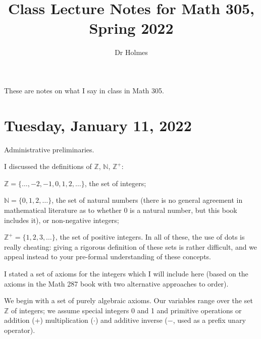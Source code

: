 \documentclass[12pt]{article}
\title{Class Lecture Notes for Math 305, Spring 2022}
\author{Dr Holmes}
\begin{document}
\maketitle

These are notes on what I say in class in Math 305.

\tableofcontents


\section{Tuesday, January 11, 2022}

Administrative preliminaries.


I discussed the definitions of ${\mathbb Z}$, ${\mathbb N}$, ${\mathbb Z}^+$: 

${\mathbb Z} = \{\ldots,-2,-1,0,1,2,\ldots\}$, the set of integers;

${\mathbb N}= \{0,1,2,\ldots\}$, the set of natural numbers (there is no general agreement in mathematical literature as to whether 0 is a natural number, but this book includes it), or non-negative integers;

${\mathbb Z}^+ = \{1,2,3,\ldots\}$, the set of positive integers.  In all of these, the use of dots is really cheating:  giving a rigorous definition of these sets is rather difficult, and we appeal instead to your pre-formal understanding of these concepts.

I stated a set of axioms for the integers which I will include here (based on the axioms in the Math 287 book with two alternative approaches to order).

We begin with a set of purely algebraic axioms.  Our variables range over the set $\mathbb Z$ of integers;  we assume special integers 0 and 1 and primitive operations or addition (+) multiplication ($\cdot$) and additive inverse ($-$, used as a prefix unary operator).
\end{document}
